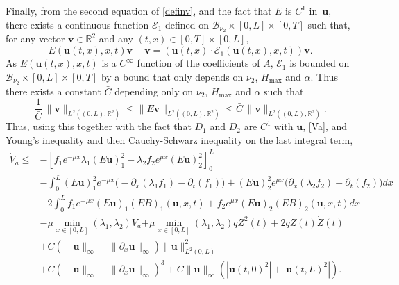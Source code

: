 \documentclass[11pt]{article}
\numberwithin{equation}{section}
\let\mathcal\mathscr
\theoremstyle{definition}
\begin{document}
Finally, from the second equation of \eqref{definv}, and the fact that $E$ is $C^{1}$ in~$\boldsymbol{u}$,
there exists a continuous function {$\mathcal{E}_{1}$} defined on $\mathcal{B}_{\nu_{2}}\times[0,L]\times[0,T]$ such that, for any vector $\boldsymbol{v}\in\mathbb{R}^{2}$ and any $(t,x)\in[0,T]\times[0,L]$,
\begin{equation}
E(\boldsymbol{u}(t,x),x,t)\boldsymbol{v}-\boldsymbol{v}=(\boldsymbol{u}(t,x)\cdot\mathcal{E}_{1}(\boldsymbol{u}(t,x),x,t))\boldsymbol{v}.
\label{recoverv}
\end{equation}
As $E(\boldsymbol{u}(t,x),x,t)$ is a $C^{\infty}$ function of the coefficients of $A$, $\mathcal{E}_{1}$ is bounded on $\mathcal{B}_{\nu_{2}}\times[0,L]\times[0,T]$ by a bound that only depends on $\nu_{2}$, $H_{\max}$ and $\alpha$.
Thus there exists a constant $\bar C$ depending only on $\nu_{2}$, $H_{\max}$ and $\alpha$ such that
\begin{equation}
\frac{1}{\bar C}\,\lVert\boldsymbol{v}\rVert_{{L^{2}((0,L);\mathbb{R}^{2})}}\leq \lVert E\boldsymbol{v}\rVert_{{L^{2}((0,L);\mathbb{R}^{2})}}\leq \bar C\, \lVert\boldsymbol{v}\rVert_{{L^{2}((0,L);\mathbb{R}^{2})}}.
\label{equivinvu}
\end{equation}
Thus, using this together with the fact that $D_{1}$ and $D_{2}$ are $C^{1}$ with $\boldsymbol{u}$, \eqref{Va}, and Young's inequality and then Cauchy-Schwarz inequality on the last integral term,
\begin{equation*}
\begin{split}
\dot V_{a}\leq& -\left[f_{1}e^{-\mu x}\lambda_{1}(E\boldsymbol{u})_{1}^{2}-\lambda_{2}f_{2}e^{\mu x}(E\boldsymbol{u})_{2}^{2}\right]_{0}^{L}\\
&-\int_{0}^{L}(E\boldsymbol{u})_{1}^{2}e^{-\mu x}\bigl(-\partial_{x}(\lambda_{1}f_{1})-\partial_{t}(f_{1})\bigr)+(E\boldsymbol{u})_{2}^{2}e^{\mu x}\bigl(\partial_{x}(\lambda_{2}f_{2})-\partial_{t}(f_{2})\bigr)dx\\
&-2\int_{0}^{L}f_{1}e^{-\mu x}(E\boldsymbol{u})_{1}(EB)_{1}(\boldsymbol{u},x,t)+f_{2}e^{\mu x}(E\boldsymbol{u})_{2}(EB)_{2}(\boldsymbol{u},x,t)dx\\
&-\mu\min\limits_{x\in[0,L]}(\lambda_{1},\lambda_{2})V_{a}{+\mu\min\limits_{x\in[0,L]}(\lambda_{1},\lambda_{2})qZ^{2}(t)}
+2qZ(t)\dot Z(t)\\
&+C\left(\lVert \boldsymbol{u}\rVert_{\infty}+\lVert \partial_{x} \boldsymbol{u}\rVert_{\infty}\right)\lVert\boldsymbol{u} \rVert_{L^{2}(0,L)}^{2}\\
&+C\left(\lVert \boldsymbol{u}\rVert_{\infty}+\lVert \partial_{x} \boldsymbol{u}\rVert_{\infty}\right)^{3}+C\lVert \boldsymbol{u}\rVert_{\infty}(|\boldsymbol{u}(t,0)^{2}|+|\boldsymbol{u}(t,L)^{2}|).
\end{split}
\end{equation*}
\end{document}
